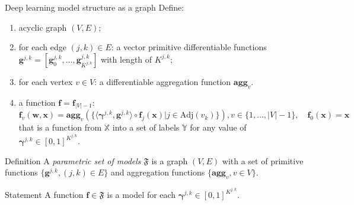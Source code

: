 \documentclass[usenames,dvipsnames,11pt,pdf,utf8,russian,aspectratio=169]{beamer}
\begin{document}
\begin{frame}{Deep learning model structure as a graph}
\footnotesize
Define:
\begin{enumerate}
 \item acyclic graph $(V,E)$;
\item for each edge $(j,k) \in E$: a vector primitive differentiable functions $\mathbf{g}^{j,k} = [\mathbf{g}^{j,k}_0, \dots, \mathbf{g}^{j,k}_{K^{j,k}}]$  with length of $K^{j,k}$;
\item for each vertex $v \in V$: a differentiable aggregation function  $\textbf{agg}_v$.
\item a function $\mathbf{f} = \mathbf{f}_{|V|-1}:$
\begin{equation}
\label{eq:modelfam}
    \mathbf{f}_{v}(\mathbf{w}, \mathbf{x}) = \textbf{agg}_{v}\left(\{ \langle \boldsymbol{\gamma}^{j,k}, \mathbf{g}^{j,k} \rangle \circ  \mathbf{f}_j(\mathbf{x})| j \in \text{Adj}(v_k)\}\right), v \in \{1,\dots,|V|-1\}, \quad \mathbf{f}_0(\mathbf{x}) = \mathbf{x}
\end{equation}
that is a function from  $\mathbb{X}$ into a set of labels $\mathbb{Y}$ for any value of  $\boldsymbol{\gamma}^{j,k} \in [0,1]^{K^{j,k}}$.
\end{enumerate}

\begin{block}{Definition}
A \textit{parametric set of models} $\mathfrak{F}$ is a graph $(V, E)$  with a set of primitive functions $\{\mathbf{g}^{j,k}, (j,k) \in E\}$ and aggregation functions  $\{ \textbf{agg}_v, {v \in V}\}$.
\end{block}
\begin{block}{Statement}
A function $\mathbf{f} \in \mathfrak{F}$ is a model for each  $\boldsymbol{\gamma}^{j,k} \in [0,1]^{K^{j,k}}$.
\end{block}
\end{frame}
\end{document}
